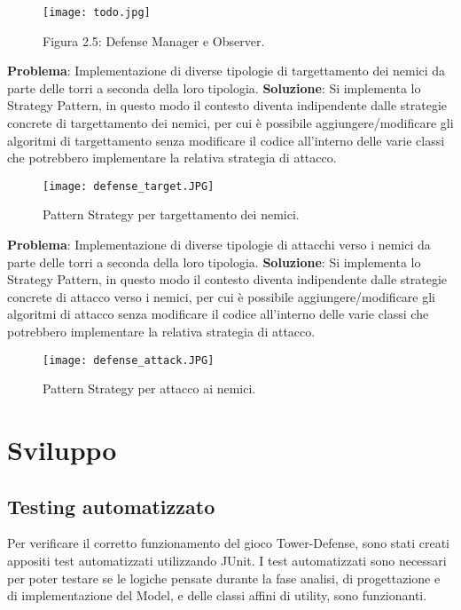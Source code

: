 \documentclass[a4paper,12pt]{report}
\begin{document}
\begin{figure}[H]
    \centering
    \texttt{[image: todo.jpg]}
    \caption{Figura 2.5: Defense Manager e Observer.}
    \label{fig:defense-observer}
\end{figure}
\vspace{50mm}
\textbf{Problema}:
Implementazione di diverse tipologie di targettamento dei nemici da parte delle torri a seconda della loro tipologia.
\textbf{Soluzione}:
Si implementa lo Strategy Pattern, in questo modo il contesto diventa indipendente dalle strategie concrete di targettamento dei nemici, per cui è possibile aggiungere/modificare gli algoritmi di targettamento senza modificare il codice all'interno delle varie classi che potrebbero implementare la relativa strategia di attacco.

\begin{figure}[H]
    \centering
    \texttt{[image: defense\_target.JPG]}
    \caption{Pattern Strategy per targettamento dei nemici.}
    \label{fig:defense_target}
\end{figure}



\textbf{Problema}:
Implementazione di diverse tipologie di attacchi verso i nemici da parte delle torri a seconda della loro tipologia.
\textbf{Soluzione}:
Si implementa lo Strategy Pattern, in questo modo il contesto diventa indipendente dalle strategie concrete di attacco verso i nemici, per cui è possibile aggiungere/modificare gli algoritmi di attacco senza modificare il codice all'interno delle varie classi che potrebbero implementare la relativa strategia di attacco.

\begin{figure}[H]
    \centering
    \texttt{[image: defense\_attack.JPG]}
    \caption{Pattern Strategy per attacco ai nemici.}
    \label{fig:defense_attack}
\end{figure}


\chapter{Sviluppo}
\section{Testing automatizzato}
Per verificare il corretto funzionamento del gioco Tower-Defense, sono stati creati appositi test automatizzati utilizzando JUnit. 
I test automatizzati sono necessari per poter testare se le logiche pensate durante la fase analisi, di progettazione e di implementazione del Model, e delle classi affini di utility, sono funzionanti.
\end{document}
